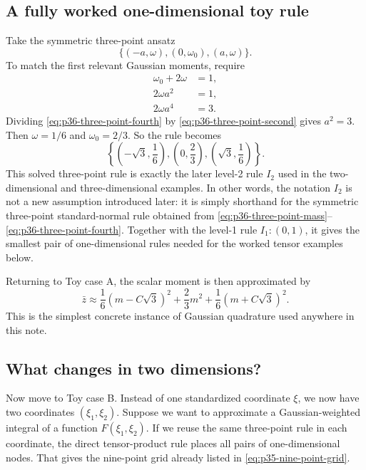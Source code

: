 \documentclass[11pt]{article}
\numberwithin{equation}{section}
\begin{document}
\subsection{A fully worked one-dimensional toy rule}

Take the symmetric three-point ansatz
\begin{equation}
  \{(-a,\omega),(0,\omega_0),(a,\omega)\}.
  \label{eq:p36-three-point-ansatz}
\end{equation}
To match the first relevant Gaussian moments, require
\begin{align}
  \omega_0+2\omega &= 1,
  \label{eq:p36-three-point-mass}\\
  2\omega a^2 &= 1,
  \label{eq:p36-three-point-second}\\
  2\omega a^4 &= 3.
  \label{eq:p36-three-point-fourth}
\end{align}
Dividing \eqref{eq:p36-three-point-fourth} by
\eqref{eq:p36-three-point-second} gives \(a^2=3\).  Then
\(\omega=1/6\) and \(\omega_0=2/3\).  So the rule becomes
\begin{equation}
  \left\{\left(-\sqrt3,\frac16\right),\left(0,\frac23\right),
  \left(\sqrt3,\frac16\right)\right\}.
  \label{eq:p36-three-point-rule}
\end{equation}
This solved three-point rule is exactly the later level-2 rule \(I_2\) used in
the two-dimensional and three-dimensional examples.  In other words, the notation
\(I_2\) is not a new assumption introduced later: it is simply shorthand for the
symmetric three-point standard-normal rule obtained from
\eqref{eq:p36-three-point-mass}--\eqref{eq:p36-three-point-fourth}.  Together
with the level-1 rule \(I_1:(0,1)\), it gives the smallest pair of
one-dimensional rules needed for the worked tensor examples below.

Returning to Toy case A, the scalar moment is then approximated by
\begin{equation}
  \bar z
  \approx
  \frac16(m-C\sqrt3)^2 + \frac23 m^2 + \frac16(m+C\sqrt3)^2.
  \label{eq:p36-scalar-three-point-approx}
\end{equation}
This is the simplest concrete instance of Gaussian quadrature used anywhere in
this note.

\subsection{What changes in two dimensions?}

Now move to Toy case B.  Instead of one standardized coordinate \(\xi\), we now
have two coordinates \((\xi_1,\xi_2)\).  Suppose we want to approximate a
Gaussian-weighted integral of a function \(F(\xi_1,\xi_2)\).  If we reuse the same
three-point rule in each coordinate, the direct tensor-product rule places all
pairs of one-dimensional nodes.  That gives the nine-point grid already listed in
\eqref{eq:p35-nine-point-grid}.
\end{document}
